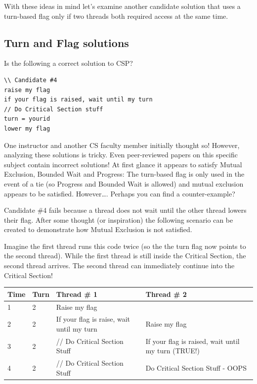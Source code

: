 With these ideas in mind let's examine another candidate solution that uses a turn-based flag only if two threads both required access at the same time.

\subsection{Turn and Flag solutions}\label{turn-and-flag-solutions}

Is the following a correct solution to CSP?

\begin{lstlisting}
\\ Candidate #4
raise my flag
if your flag is raised, wait until my turn
// Do Critical Section stuff
turn = yourid
lower my flag
\end{lstlisting}

One instructor and another CS faculty member initially thought so! However, analyzing these solutions is tricky. Even peer-reviewed papers on this specific subject contain incorrect solutions! At first glance it appears to satisfy Mutual Exclusion, Bounded Wait and Progress: The turn-based flag is only used in the event of a tie (so Progress and Bounded Wait is allowed) and mutual exclusion appears to be satisfied. However\ldots{}. Perhaps you can find a counter-example?

Candidate \#4 fails because a thread does not wait until the other thread lowers their flag. After some thought (or inspiration) the following scenario can be created to demonstrate how Mutual Exclusion is not satisfied.

Imagine the first thread runs this code twice (so the the turn flag now points to the second thread). While the first thread is still inside the Critical Section, the second thread arrives. The second thread can immediately continue into the Critical Section!

\begin{tabular}{|l|l|l|l|}
Time & Turn & Thread \# 1 & Thread \# 2 \\ \hline
1 & 2 & Raise my flag & \\
2 & 2 & If your flag is raise, wait until my turn & Raise my flag \\
3 & 2 & // Do Critical Section Stuff & If your flag is raised, wait until my turn (TRUE!) \\
4 & 2 & // Do Critical Section Stuff & Do Critical Section Stuff - OOPS \\
\end{tabular}


